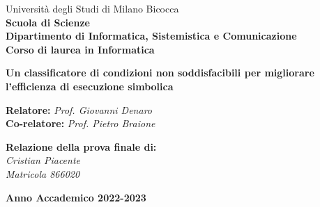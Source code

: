 \documentclass[a4paper, 12pt, oneside]{book}
\theoremstyle{normal}
\begin{document}
\begin{titlepage}

    \noindent
    \begin{minipage}[t]{0.19\textwidth}
    \end{minipage}
    \begin{minipage}[t]{0.8\textwidth}
    {
        Università degli Studi di Milano Bicocca \\
        \textbf{Scuola di Scienze} \\
        \textbf{Dipartimento di Informatica, Sistemistica e Comunicazione} \\
        \textbf{Corso di laurea in Informatica} \\
        \par
    }
    \end{minipage}

    \noindent
    \vspace{20mm}
    \begin{center}
    {
        \LARGE{
            \textbf{Un classificatore di condizioni non soddisfacibili per migliorare l'efficienza di esecuzione simbolica}
            \par
        }
    }
    \end{center}
    
    \vspace{70mm}

    \noindent
    {\large \textbf{Relatore:} \textit{Prof. Giovanni Denaro}} \\

    \noindent
    {\large \textbf{Co-relatore:} \textit{Prof. Pietro Braione}}
    
    \vspace{15mm}

    \noindent
    \begin{flushright}
        \textbf{\large Relazione della prova finale di:} \\
        \large{\textit{Cristian Piacente}}\\
        \large{\textit{Matricola 866020}}
    \end{flushright}
    
    \vspace{25mm}

    \noindent
    \begin{center}
        {\large{\textbf{Anno Accademico 2022-2023}}}
    \end{center}
    
\end{titlepage}
\restoregeometry
\end{document}
